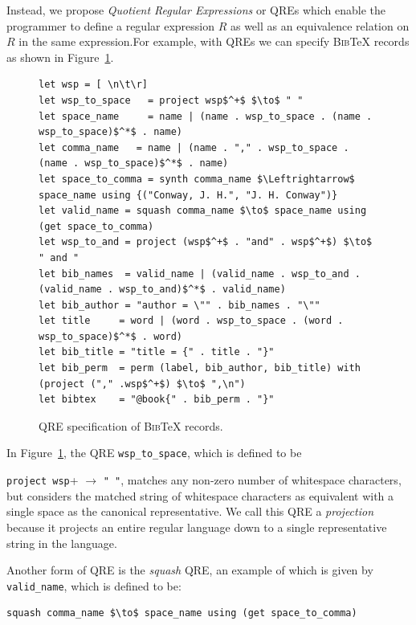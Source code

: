 \documentclass{svproc}
\newcommand{\cd}[1]{\lstinline[backgroundcolor=\color{white}]$#1$}
\newcommand{\bibtex}{\textsc{Bib}\TeX{}}
\begin{document}
Instead, we propose {\em Quotient Regular Expressions} or QREs which enable
the programmer to define a regular expression $R$ as well as an equivalence
relation on $R$ in the same expression.For example, with QREs we can specify
\bibtex{} records as shown in Figure~\ref{fig:example-qre}.

\begin{figure}[t]
\begin{lstlisting}
let wsp = [ \n\t\r]
let wsp_to_space   = project wsp$^+$ $\to$ " "
let space_name     = name | (name . wsp_to_space . (name . wsp_to_space)$^*$ . name)
let comma_name   = name | (name . "," . wsp_to_space . (name . wsp_to_space)$^*$ . name)
let space_to_comma = synth comma_name $\Leftrightarrow$ space_name using {("Conway, J. H.", "J. H. Conway")} 
let valid_name = squash comma_name $\to$ space_name using (get space_to_comma)
let wsp_to_and = project (wsp$^+$ . "and" . wsp$^+$) $\to$ " and " 
let bib_names  = valid_name | (valid_name . wsp_to_and . (valid_name . wsp_to_and)$^*$ . valid_name) 
let bib_author = "author = \"" . bib_names . "\""
let title     = word | (word . wsp_to_space . (word . wsp_to_space)$^*$ . word) 
let bib_title = "title = {" . title . "}" 
let bib_perm  = perm (label, bib_author, bib_title) with (project ("," .wsp$^+$) $\to$ ",\n")
let bibtex    = "@book{" . bib_perm . "}"
\end{lstlisting}
\caption{QRE specification of \bibtex{} records. }
  \label{fig:example-qre}
\end{figure}

In Figure~\ref{fig:example-qre}, the QRE \cd{wsp_to_space}, which is defined to
be 

\noindent \cd{project wsp}+ $\to$ \cd{" "}, matches any non-zero number of
whitespace characters, but considers the matched string of whitespace
characters as equivalent with a single space as the canonical representative. 
We call this QRE a \textit{projection} because it projects an
entire regular language down to a single representative string in the
language.

Another form of QRE is the \textit{squash} QRE, an example of which is given by
\cd{valid_name}, which is defined to be:

\begin{center}
\begin{lstlisting}
squash comma_name $\to$ space_name using (get space_to_comma)
\end{lstlisting}
\end{center}
\end{document}
